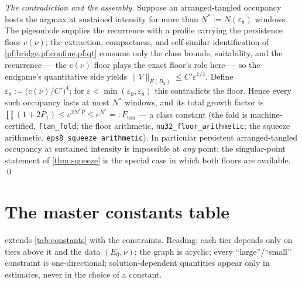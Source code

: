 \documentclass[11pt,letterpaper]{amsart}
\theoremstyle{definition}
\theoremstyle{remark}
\newcommand{\norm}[1]{\lVert #1 \rVert}
\begin{document}
\emph{The contradiction and the assembly.} Suppose an arranged-tangled occupancy
hosts the argmax at sustained intensity for more than $N^*:=N(\varepsilon_8)$
windows. The pigeonhole supplies the recurrence with a profile carrying the
persistence floor $c(\nu)$; the extraction, compactness, and self-similar
identification of \cref{pf:bridge,pf:confine,pf:qt} consume only the class
bounds, suitability, and the recurrence --- the $c(\nu)$ floor plays the exact
floor's role here --- so the endgame's quantitative side yields
$\norm{V}_{E(B_2)}\le C'\varepsilon^{1/4}$. Define
$\varepsilon_8:=\bigl(c(\nu)/C'\bigr)^{4}$; for
$\varepsilon<\min(\varepsilon_0,\varepsilon_8)$ this contradicts
the floor. Hence every such occupancy lasts at most $N^*$ windows, and its total
growth factor is
$\prod(1+2P_1)\le e^{2N^*\bar P}\le e^{N^*}=:F_{\mathrm{tan}}$ --- a class
constant (the fold is machine-certified, \texttt{ftan\_fold}; the floor
arithmetic, \texttt{nu32\_floor\_arithmetic}; the squeeze arithmetic,
\texttt{eps8\_squeeze\_arithmetic}). In particular persistent arranged-tangled occupancy at sustained
intensity is impossible at \emph{any} point; the singular-point statement of
\cref{thm:squeeze} is the special case in which both floors are available. \qed

\appendix

\section{The master constants table}\label{app:constants}

 extends \cref{tab:constants} with the constraints. Reading:
each tier depends only on tiers above it and the data $(E_0,\nu)$; the graph is
acyclic; every ``large''/``small'' constraint is one-directional; solution-dependent
quantities appear only in estimates, never in the choice of a constant.
\end{document}
